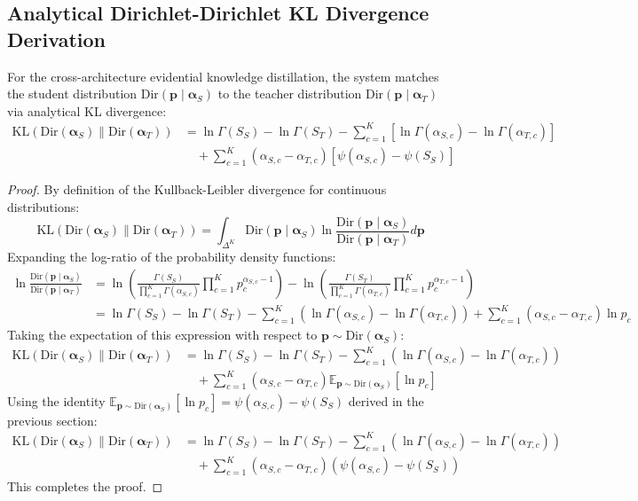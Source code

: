 \documentclass[letterpaper]{article} %
\newcommand{\Dir}{\text{Dir}}
\newcommand{\KL}{\text{KL}}
\begin{document}
\subsection{Analytical Dirichlet-Dirichlet KL Divergence Derivation}
For the cross-architecture evidential knowledge distillation, the system matches the student distribution $\Dir(\bm{p} \mid \bm{\alpha}_S)$ to the teacher distribution $\Dir(\bm{p} \mid \bm{\alpha}_T)$ via analytical KL divergence:
\begin{align}
    \KL(\Dir(\bm{\alpha}_S) \| \Dir(\bm{\alpha}_T)) &= \ln\Gamma(S_S) - \ln\Gamma(S_T) - \sum_{c=1}^K \left[\ln\Gamma(\alpha_{S,c}) - \ln\Gamma(\alpha_{T,c})\right] \nonumber \\
    &\quad + \sum_{c=1}^K (\alpha_{S,c} - \alpha_{T,c})\left[\psi(\alpha_{S,c}) - \psi(S_S)\right]
\end{align}

\begin{proof}
By definition of the Kullback-Leibler divergence for continuous distributions:
\begin{equation}
    \KL(\Dir(\bm{\alpha}_S) \| \Dir(\bm{\alpha}_T)) = \int_{\Delta^K} \Dir(\bm{p} \mid \bm{\alpha}_S) \ln \frac{\Dir(\bm{p} \mid \bm{\alpha}_S)}{\Dir(\bm{p} \mid \bm{\alpha}_T)} d\bm{p}
\end{equation}
Expanding the log-ratio of the probability density functions:
\begin{align}
    \ln \frac{\Dir(\bm{p} \mid \bm{\alpha}_S)}{\Dir(\bm{p} \mid \bm{\alpha}_T)} &= \ln \left( \frac{\Gamma(S_S)}{\prod_{c=1}^K \Gamma(\alpha_{S,c})} \prod_{c=1}^K p_c^{\alpha_{S,c}-1} \right) - \ln \left( \frac{\Gamma(S_T)}{\prod_{c=1}^K \Gamma(\alpha_{T,c})} \prod_{c=1}^K p_c^{\alpha_{T,c}-1} \right) \\
    &= \ln \Gamma(S_S) - \ln \Gamma(S_T) - \sum_{c=1}^K \left( \ln \Gamma(\alpha_{S,c}) - \ln \Gamma(\alpha_{T,c}) \right) + \sum_{c=1}^K (\alpha_{S,c} - \alpha_{T,c}) \ln p_c
\end{align}
Taking the expectation of this expression with respect to $\bm{p} \sim \Dir(\bm{\alpha}_S)$:
\begin{align}
    \KL(\Dir(\bm{\alpha}_S) \| \Dir(\bm{\alpha}_T)) &= \ln \Gamma(S_S) - \ln \Gamma(S_T) - \sum_{c=1}^K \left( \ln \Gamma(\alpha_{S,c}) - \ln \Gamma(\alpha_{T,c}) \right) \nonumber \\
    &\quad + \sum_{c=1}^K (\alpha_{S,c} - \alpha_{T,c}) \mathbb{E}_{\bm{p} \sim \Dir(\bm{\alpha}_S)} [\ln p_c]
\end{align}
Using the identity $\mathbb{E}_{\bm{p} \sim \Dir(\bm{\alpha}_S)} [\ln p_c] = \psi(\alpha_{S,c}) - \psi(S_S)$ derived in the previous section:
\begin{align}
    \KL(\Dir(\bm{\alpha}_S) \| \Dir(\bm{\alpha}_T)) &= \ln \Gamma(S_S) - \ln \Gamma(S_T) - \sum_{c=1}^K \left( \ln \Gamma(\alpha_{S,c}) - \ln \Gamma(\alpha_{T,c}) \right) \nonumber \\
    &\quad + \sum_{c=1}^K (\alpha_{S,c} - \alpha_{T,c}) \left( \psi(\alpha_{S,c}) - \psi(S_S) \right)
\end{align}
This completes the proof.
\end{proof}
\end{document}
